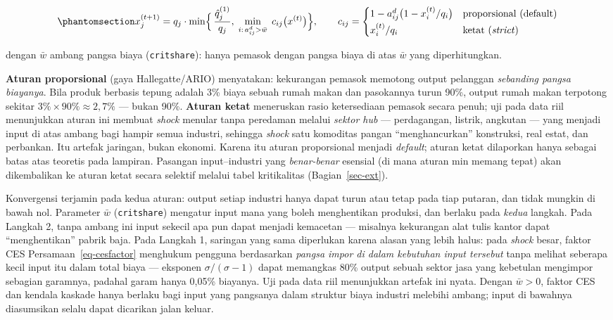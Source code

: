\documentclass[
  manuscript=article,
  layout=publish,
  year=2026,
  volume=1,
]{den}
\begin{document}
\begin{equation}\phantomsection\label{eq-cascade}{
x^{(t+1)}_j = q_j \cdot
\min\Bigl\{\, \frac{\hat q^{(1)}_j}{q_j},\;
\min_{i:\, a^d_{ij} > \bar w} \; c_{ij}\bigl(x^{(t)}\bigr) \Bigr\},
\qquad
c_{ij} =
\begin{cases}
1 - a^d_{ij}\bigl(1 - x^{(t)}_i/q_i\bigr) & \text{proporsional (default)}\\[2pt]
x^{(t)}_i / q_i & \text{ketat (\emph{strict})}
\end{cases}
}\end{equation}

dengan \(\bar w\) ambang pangsa biaya (\texttt{critshare}): hanya
pemasok dengan pangsa biaya di atas \(\bar w\) yang diperhitungkan.

\textbf{Aturan proporsional} (gaya Hallegatte/ARIO) menyatakan:
kekurangan pemasok memotong output pelanggan \emph{sebanding pangsa
biayanya}. Bila produk berbasis tepung adalah 3\% biaya sebuah rumah
makan dan pasokannya turun 90\%, output rumah makan terpotong sekitar
\(3\% \times 90\% \approx 2{,}7\%\) --- bukan 90\%. \textbf{Aturan
ketat} meneruskan rasio ketersediaan pemasok secara penuh; uji pada data
riil menunjukkan aturan ini membuat \emph{shock} menular tanpa peredaman
melalui \emph{sektor hub} --- perdagangan, listrik, angkutan --- yang
menjadi input di atas ambang bagi hampir semua industri, sehingga
\emph{shock} satu komoditas pangan ``menghancurkan'' konstruksi, real
estat, dan perbankan. Itu artefak jaringan, bukan ekonomi. Karena itu
aturan proporsional menjadi \emph{default}; aturan ketat dilaporkan
hanya sebagai batas atas teoretis pada lampiran. Pasangan
input--industri yang \emph{benar-benar} esensial (di mana aturan min
memang tepat) akan dikembalikan ke aturan ketat secara selektif melalui
tabel kritikalitas (Bagian~\ref{sec-ext}).

Konvergensi terjamin pada kedua aturan: output setiap industri hanya
dapat turun atau tetap pada tiap putaran, dan tidak mungkin di bawah
nol. Parameter \(\bar w\) (\texttt{critshare}) mengatur input mana yang
boleh menghentikan produksi, dan berlaku pada \emph{kedua} langkah. Pada
Langkah 2, tanpa ambang ini input sekecil apa pun dapat menjadi
kemacetan --- misalnya kekurangan alat tulis kantor dapat
``menghentikan'' pabrik baja. Pada Langkah 1, saringan yang sama
diperlukan karena alasan yang lebih halus: pada \emph{shock} besar,
faktor CES Persamaan~\ref{eq-cesfactor} menghukum pengguna berdasarkan
\emph{pangsa impor di dalam kebutuhan input tersebut} tanpa melihat
seberapa kecil input itu dalam total biaya --- eksponen
\(\sigma/(\sigma-1)\) dapat memangkas 80\% output sebuah sektor jasa
yang kebetulan mengimpor sebagian garamnya, padahal garam hanya 0,05\%
biayanya. Uji pada data riil menunjukkan artefak ini nyata. Dengan
\(\bar w > 0\), faktor CES dan kendala kaskade hanya berlaku bagi input
yang pangsanya dalam struktur biaya industri melebihi ambang; input di
bawahnya diasumsikan selalu dapat dicarikan jalan keluar.
\end{document}
